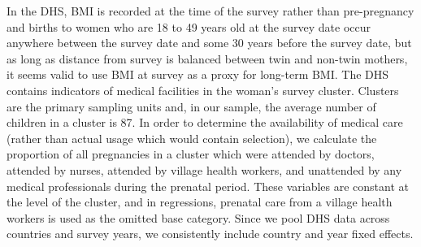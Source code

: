 \documentclass[12pt]{article}
\begin{document}
In the DHS, BMI is recorded at the time of the survey rather than pre-pregnancy and births to women who are 18 to 49 years old at the survey date occur anywhere between the survey date and some 30 years before the survey date, but as long as distance from survey is balanced between twin and non-twin mothers, it seems valid to use BMI at survey as a proxy for long-term BMI. The DHS contains indicators of medical facilities in the woman's survey cluster. Clusters  are the primary sampling units and, in our sample, the average number of children in a cluster is 87. In order to determine the availability of medical care (rather than actual usage which would contain selection), we calculate the proportion of all pregnancies in a cluster which were attended by doctors, attended by nurses, attended by village health workers, and unattended by any medical professionals during the prenatal period. These variables are constant at the level of the cluster, and in regressions, prenatal care from a village health workers is used as the omitted base category. Since we pool DHS data across countries and survey years, we consistently include country and year fixed effects. %
\end{document}
